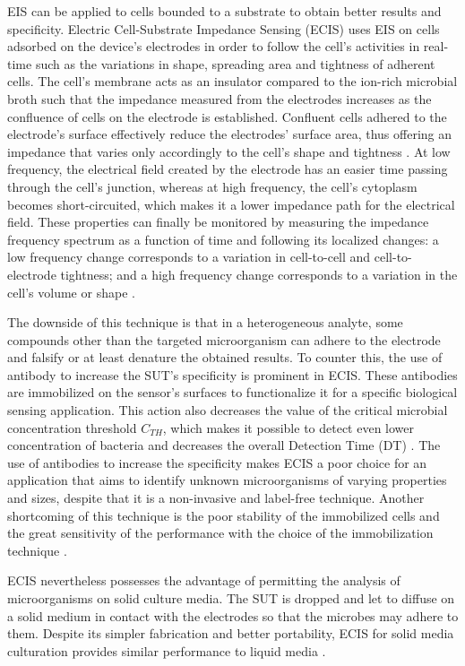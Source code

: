 EIS can be applied to cells bounded to a substrate to obtain better results and specificity. Electric Cell-Substrate Impedance Sensing (ECIS) uses EIS on cells adsorbed on the device’s electrodes in order to follow the cell’s activities in real-time such as the variations in shape, spreading area and tightness of adherent cells. The cell’s membrane acts as an insulator compared to the ion-rich microbial broth such that the impedance measured from the electrodes increases as the confluence of cells on the electrode is established. Confluent cells adhered to the electrode’s surface effectively reduce the electrodes’ surface area, thus offering an impedance that varies only accordingly to the cell’s shape and tightness \cite{Wegener1999,Xu2016}. At low frequency, the electrical field created by the electrode has an easier time passing through the cell’s junction, whereas at high frequency, the cell’s cytoplasm becomes short-circuited, which makes it a lower impedance path for the electrical field. These properties can finally be monitored by measuring the impedance frequency spectrum as a function of time and following its localized changes: a low frequency change corresponds to a variation in cell-to-cell and cell-to-electrode tightness; and a high frequency change corresponds to a variation in the cell’s volume or shape \cite{AppliedBiophysics}. \par

The downside of this technique is that in a heterogeneous analyte, some compounds other than the targeted microorganism can adhere to the electrode and falsify or at least denature the obtained results. To counter this, the use of antibody to increase the SUT’s specificity is prominent in ECIS. These antibodies are immobilized on the sensor’s surfaces to functionalize it for a specific biological sensing application. This action also decreases the value of the critical microbial concentration threshold $C_{TH}$, which makes it possible to detect even lower concentration of bacteria and decreases the overall Detection Time (DT) \cite{Lei2014}. The use of antibodies to increase the specificity makes ECIS a poor choice for an application that aims to identify unknown microorganisms of varying properties and sizes, despite that it is a non-invasive and label-free technique. Another shortcoming of this technique is the poor stability of the immobilized cells and the great sensitivity of the performance with the choice of the immobilization technique \cite{Grossi2017}. \par

ECIS nevertheless possesses the advantage of permitting the analysis of microorganisms on solid culture media. The SUT is dropped and let to diffuse on a solid medium in contact with the electrodes so that the microbes may adhere to them. Despite its simpler fabrication and better portability, ECIS for solid media culturation provides similar performance to liquid media \cite{Choi2009}.
